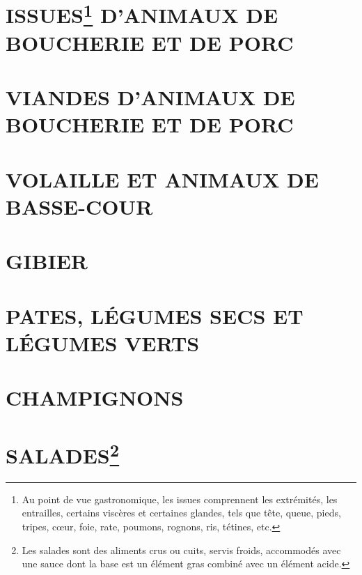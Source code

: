 \chapter*{\centering ISSUES\footnote{ Au point de vue gastronomique, les issues
comprennent les extrémités, les entrailles, certains viscères et certaines
glandes, tels que tête, queue, pieds, tripes, cœur, foie, rate, poumons,
rognons, ris, tétines, etc.} D'ANIMAUX DE BOUCHERIE ET DE PORC}


\chapter*{\centering VIANDES D'ANIMAUX DE BOUCHERIE ET DE PORC}


\chapter*{\centering VOLAILLE ET ANIMAUX DE BASSE-COUR}


\chapter*{\centering GIBIER}


\chapter*{\centering PATES, LÉGUMES SECS ET LÉGUMES VERTS}


\chapter*{\centering CHAMPIGNONS}


\chapter*{\centering SALADES\footnote{
                  Les salades sont des aliments crus ou
                  cuits, servis froids, accommodés avec une sauce dont la base est un élément
                  gras combiné avec un élément acide.}}


